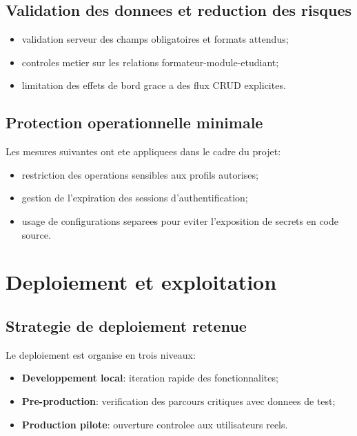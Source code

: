 ﻿\documentclass[12pt,a4paper,oneside]{report}
\begin{document}
\subsection{Validation des donnees et reduction des risques}

\begin{itemize}
  \item validation serveur des champs obligatoires et formats attendus;
  \item controles metier sur les relations formateur-module-etudiant;
  \item limitation des effets de bord grace a des flux CRUD explicites.
\end{itemize}

\subsection{Protection operationnelle minimale}

Les mesures suivantes ont ete appliquees dans le cadre du projet:
\begin{itemize}
  \item restriction des operations sensibles aux profils autorises;
  \item gestion de l'expiration des sessions d'authentification;
  \item usage de configurations separees pour eviter l'exposition de secrets en code source.
\end{itemize}

\section{Deploiement et exploitation}

\subsection{Strategie de deploiement retenue}

Le deploiement est organise en trois niveaux:
\begin{itemize}
  \item \textbf{Developpement local}: iteration rapide des fonctionnalites;
  \item \textbf{Pre-production}: verification des parcours critiques avec donnees de test;
  \item \textbf{Production pilote}: ouverture controlee aux utilisateurs reels.
\end{itemize}
\end{document}
